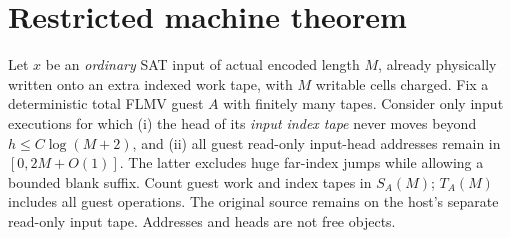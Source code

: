 \documentclass[11pt]{article}
\begin{document}
\section{Restricted machine theorem}
Let $x$ be an \emph{ordinary} SAT input of actual encoded length $M$, already physically written onto an extra indexed work tape, with $M$ writable cells charged. Fix a deterministic total FLMV guest $A$ with finitely many tapes. Consider only input executions for which (i) the head of its \emph{input index tape} never moves beyond $h\le C\log(M+2)$, and (ii) all guest read-only input-head addresses remain in $[0,2M+O(1)]$. The latter excludes huge far-index jumps while allowing a bounded blank suffix. Count guest work and index tapes in $S_A(M)$; $T_A(M)$ includes all guest operations. The original source remains on the host's separate read-only input tape. Addresses and heads are not free objects.
\end{document}
